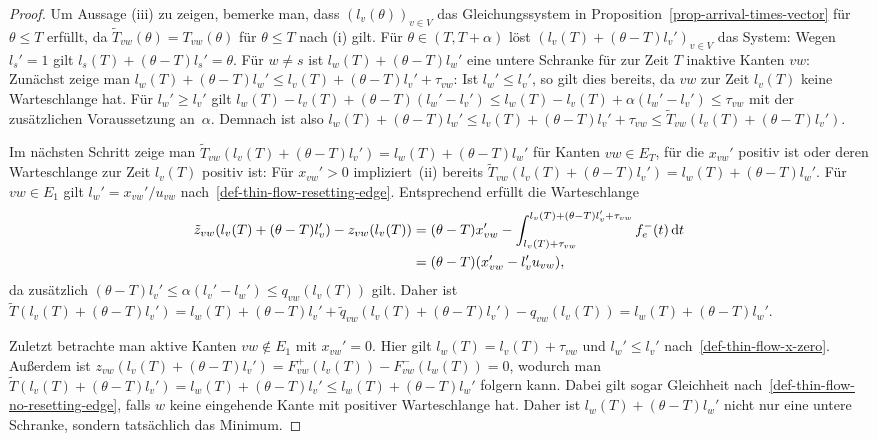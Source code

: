 \begin{proof}
	Um Aussage (iii) zu zeigen, bemerke man, dass $(l_v(\theta))_{v\in V}$ das Gleichungssystem in Proposition~\ref{prop-arrival-times-vector} für $\theta \leq T$ erfüllt, da $\tilde{T}_{vw}(\theta) = T_{vw}(\theta)$ für $\theta\leq T$ nach (i) gilt.
	Für $\theta \in (T, T+\alpha)$ löst $(l_v(T) + (\theta - T)l_v')_{v\in V}$  das System:
	Wegen $l_s' = 1$ gilt $l_s(T) + (\theta - T)l_s' = \theta$.
	Für $w\neq s$ ist $l_w(T) + (\theta - T) l_w'$ eine untere Schranke für zur Zeit $T$ inaktive Kanten $vw$:
	Zunächst zeige man $l_w(T) + (\theta - T)l_w' \leq l_v(T) + (\theta - T)l_v' + \tau_{vw}$:
	Ist $l_w' \leq l_v'$, so gilt dies bereits, da $vw$ zur Zeit $l_v(T)$ keine Warteschlange hat.
	Für $l_w' \geq l_v'$ gilt $l_w(T) - l_v(T) + (\theta - T) (l_w' - l_v') \leq l_w(T) - l_v(T) + \alpha (l_w' - l_v') \leq \tau_{vw}$ mit der zusätzlichen Voraussetzung an~$\alpha$.
	Demnach ist also $l_w(T) + (\theta - T) l_w' \leq l_v(T) + (\theta - T) l_v' + \tau_{vw} \leq \tilde{T}_{vw}(l_v(T) + (\theta - T) l_v')$.
	
	Im nächsten Schritt zeige man $\tilde{T}_{vw}(l_v(T) + (\theta - T)l_v') = l_w(T) + (\theta - T) l_w'$ für Kanten $vw\in E_T$, für die $x_{vw}'$ positiv ist oder deren Warteschlange zur Zeit $l_v(T)$ positiv ist:
	Für $x_{vw}' > 0$ impliziert~(ii) bereits $\tilde{T}_{vw}(l_v(T) + (\theta-T)l_v') = l_w(T) + (\theta - T) l_w'$.
	Für $vw\in E_1$ gilt $l_w' = x_{vw}' / u_{vw}$ nach~\ref{def-thin-flow-resetting-edge}.
	Entsprechend erfüllt die Warteschlange
	\begin{align*}
	\tilde{z}_{vw}(l_v(T) + (\theta - T)l_v') - z_{vw}(l_v(T)) &= (\theta - T) x_{vw}' - \int_{l_v(T) + \tau_{vw}}^{l_v(T) + (\theta - T) l_v' + \tau_{vw}} f_e^-(t) \mathop{}\!\mathrm{d} t \\
	&= (\theta - T) (x_{vw}' -l_v' u_{vw}),
	\end{align*}
	da zusätzlich $(\theta-T) l_v' \leq \alpha (l_v' - l_w') \leq q_{vw}(l_v(T))$ gilt.
	Daher ist $\tilde{T}(l_v(T) + (\theta - T)l_v') = l_w(T) + (\theta - T) l_v'  + \tilde{q}_{vw}(l_v(T) + (\theta - T)l_v')- q_{vw}(l_v(T)) = l_w(T) + (\theta - T) l_w'$.
	
	Zuletzt betrachte man aktive Kanten $vw\notin E_1$ mit $x_{vw}' = 0$.
	Hier gilt $l_w(T) = l_v(T) + \tau_{vw}$ und $l_w' \leq l_v'$ nach~\ref{def-thin-flow-x-zero}.
	Außerdem ist $z_{vw}(l_v(T) + (\theta - T) l_v') = F_{vw}^+(l_v(T)) - F_{vw}^-(l_w(T)) = 0$, wodurch man $\tilde{T}(l_v(T) + (\theta - T) l_v') = l_w(T) + (\theta - T)l_v' \leq l_w(T) + (\theta - T) l_w'$ folgern kann.
	Dabei gilt sogar Gleichheit nach~\ref{def-thin-flow-no-resetting-edge}, falls $w$ keine eingehende Kante mit positiver Warteschlange hat.
	Daher ist $l_w(T)+(\theta - T) l_w'$ nicht nur eine untere Schranke, sondern tatsächlich das Minimum.
	

\end{proof}
